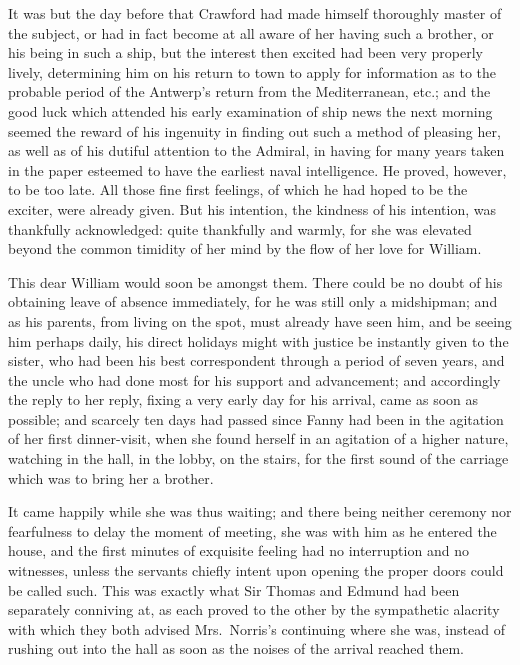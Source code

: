 \documentclass{article}
\begin{document}
It was but the day before that Crawford had made himself
thoroughly master of the subject, or had in fact become
at all aware of her having such a brother, or his being
in such a ship, but the interest then excited had been
very properly lively, determining him on his return to
town to apply for information as to the probable period
of the Antwerp's return from the Mediterranean, etc.;
and the good luck which attended his early examination
of ship news the next morning seemed the reward of his
ingenuity in finding out such a method of pleasing her,
as well as of his dutiful attention to the Admiral,
in having for many years taken in the paper esteemed
to have the earliest naval intelligence.  He proved,
however, to be too late.  All those fine first feelings,
of which he had hoped to be the exciter, were already given.
But his intention, the kindness of his intention,
was thankfully acknowledged:  quite thankfully and warmly,
for she was elevated beyond the common timidity of her
mind by the flow of her love for William.

This dear William would soon be amongst them.  There could
be no doubt of his obtaining leave of absence immediately,
for he was still only a midshipman; and as his parents,
from living on the spot, must already have seen him,
and be seeing him perhaps daily, his direct holidays
might with justice be instantly given to the sister,
who had been his best correspondent through a period of
seven years, and the uncle who had done most for his support
and advancement; and accordingly the reply to her reply,
fixing a very early day for his arrival, came as soon
as possible; and scarcely ten days had passed since Fanny
had been in the agitation of her first dinner-visit,
when she found herself in an agitation of a higher nature,
watching in the hall, in the lobby, on the stairs,
for the first sound of the carriage which was to bring her
a brother.

It came happily while she was thus waiting; and there
being neither ceremony nor fearfulness to delay the moment
of meeting, she was with him as he entered the house,
and the first minutes of exquisite feeling had no interruption
and no witnesses, unless the servants chiefly intent
upon opening the proper doors could be called such.
This was exactly what Sir Thomas and Edmund had been
separately conniving at, as each proved to the other
by the sympathetic alacrity with which they both advised
Mrs.\ Norris's continuing where she was, instead of rushing
out into the hall as soon as the noises of the arrival
reached them.
\end{document}
